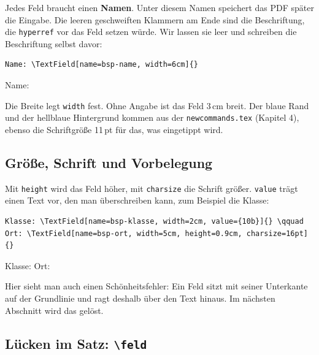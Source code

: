 \begin{Form}
Jedes Feld braucht einen \textbf{Namen}. Unter diesem Namen speichert das PDF
später die Eingabe. Die leeren geschweiften Klammern am Ende sind die
Beschriftung, die \texttt{hyperref} vor das Feld setzen würde. Wir lassen sie
leer und schreiben die Beschriftung selbst davor:

\begin{lstlisting}[style=latex]
Name: \TextField[name=bsp-name, width=6cm]{}
\end{lstlisting}

\begin{ausgabe}
Name: \TextField[name=bsp-name, width=6cm]{}
\end{ausgabe}


Die Breite legt \texttt{width} fest. Ohne Angabe ist das Feld 3\,cm breit. Der
blaue Rand und der hellblaue Hintergrund kommen aus der
\texttt{newcommands.tex} (Kapitel 4), ebenso die Schriftgröße 11\,pt für das,
was eingetippt wird.

\subsection{Größe, Schrift und Vorbelegung}

Mit \texttt{height} wird das Feld höher, mit \texttt{charsize} die Schrift
größer. \texttt{value} trägt einen Text vor, den man überschreiben kann, zum
Beispiel die Klasse:

\begin{lstlisting}[style=latex]
Klasse: \TextField[name=bsp-klasse, width=2cm, value={10b}]{} \qquad
Ort: \TextField[name=bsp-ort, width=5cm, height=0.9cm, charsize=16pt]{}
\end{lstlisting}

\begin{ausgabe}
Klasse: \TextField[name=bsp-klasse, width=2cm, value={10b}]{} \qquad
Ort: \TextField[name=bsp-ort, width=5cm, height=0.9cm, charsize=16pt]{}
\end{ausgabe}


Hier sieht man auch einen Schönheitsfehler: Ein Feld sitzt mit seiner
Unterkante auf der Grundlinie und ragt deshalb über den Text hinaus. Im
nächsten Abschnitt wird das gelöst.

\subsection{Lücken im Satz: \texttt{\textbackslash feld}}


\end{Form}

